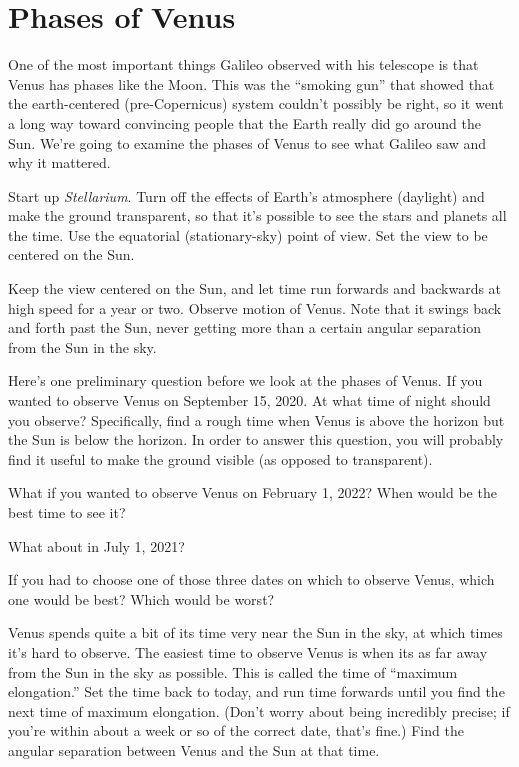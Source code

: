 \chapter{Phases of Venus}


One of the most important things Galileo observed with his telescope is that
Venus has phases like the Moon.   This was the ``smoking gun'' that showed
that the earth-centered (pre-Copernicus) system couldn't possibly be right,
so it went a long way toward convincing people that the Earth really did
go around the Sun.  We're going to examine the phases of Venus to see what
Galileo saw and why it mattered. 

Start up \textit{Stellarium}.
Turn off 
the effects of Earth's atmosphere (daylight) and 
make the ground transparent,
so that it's possible to see the stars and planets all the time.
Use the equatorial (stationary-sky) point of view.
Set the view to be centered on the Sun.

Keep the view centered on the Sun, and let time run forwards and backwards 
at high speed for a year or two.
Observe
motion of Venus.  Note that it swings back and forth past the Sun,
never getting more than a certain angular separation from the Sun in the sky. 

Here's one preliminary question before we look at the phases of Venus.
If you wanted to observe Venus on September 15, 2020.
At what time of night should you
observe?  Specifically, find a rough time when Venus is above the
horizon but the Sun is below the horizon. In order to answer this
question, you will probably find it useful to make the ground visible (as
opposed to
transparent).



\vskip 0.7in

What if you wanted to observe Venus on February 1, 2022? When would be the
best time to see it?

\vskip 0.7in

What about in July 1, 2021?

\vskip 0.7in


If you had to choose one of those three dates on which to observe
Venus, which one would be best? Which would be worst?

\vskip 0.7in

Venus spends quite a bit of its time very near the Sun in the sky,
at which times it's hard to observe.
The easiest time to observe Venus is when its as far away from
the Sun in the sky as possible.  This is called the time of ``maximum
elongation.''  Set the time back to today, 
and run time forwards until you find the next time of maximum
elongation. 
(Don't worry about being incredibly precise; if you're
within about a week or so of the correct date, that's fine.)
Find the angular
separation between
Venus and the Sun at that time. 


